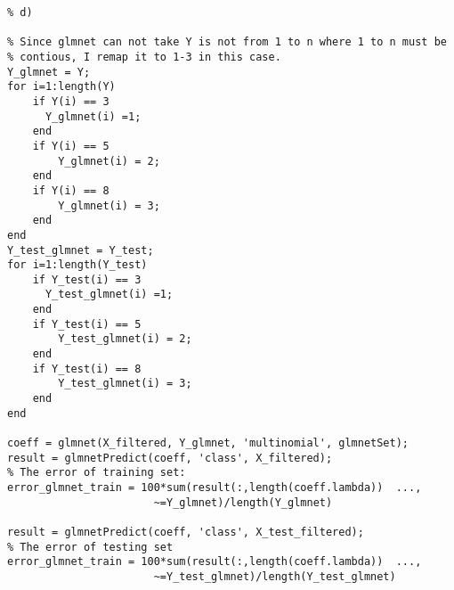 \documentclass[pra,groupedaddress,amsmath,amssymb, column]{revtex4}
\begin{document}
\begin{verbatim}
% d)

% Since glmnet can not take Y is not from 1 to n where 1 to n must be
% contious, I remap it to 1-3 in this case.
Y_glmnet = Y;
for i=1:length(Y)
    if Y(i) == 3
      Y_glmnet(i) =1;
    end
    if Y(i) == 5
        Y_glmnet(i) = 2;
    end
    if Y(i) == 8
        Y_glmnet(i) = 3;
    end
end
Y_test_glmnet = Y_test;
for i=1:length(Y_test)
    if Y_test(i) == 3
      Y_test_glmnet(i) =1;
    end
    if Y_test(i) == 5
        Y_test_glmnet(i) = 2;
    end
    if Y_test(i) == 8
        Y_test_glmnet(i) = 3;
    end
end

coeff = glmnet(X_filtered, Y_glmnet, 'multinomial', glmnetSet); 
result = glmnetPredict(coeff, 'class', X_filtered); 
% The error of training set:
error_glmnet_train = 100*sum(result(:,length(coeff.lambda))  ...,
                       ~=Y_glmnet)/length(Y_glmnet)

result = glmnetPredict(coeff, 'class', X_test_filtered); 
% The error of testing set
error_glmnet_train = 100*sum(result(:,length(coeff.lambda))  ...,
                       ~=Y_test_glmnet)/length(Y_test_glmnet)
\end{verbatim}
\end{document}
